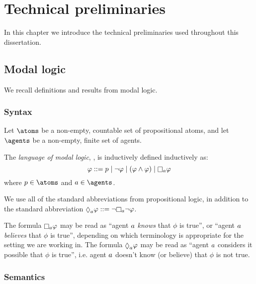 \chapter{Technical preliminaries}

In this chapter we introduce the technical preliminaries used throughout this dissertation.

\section{Modal logic}

We recall definitions and results from modal logic.

\subsection{Syntax}

Let $\atoms$ be a non-empty, countable set of propositional atoms, and
let $\agents$ be a non-empty, finite set of agents.

\begin{definition}
The {\em language of modal logic}, \langMl{}, is inductively defined inductively as:
$$
\phi ::= 
    \atomP \mid
    \lnot \phi \mid
    (\phi \land \phi) \mid
    \necessary[\agentA] \phi
$$
where $\atomP \in \atoms$ and $\agentA \in \agents$.
\end{definition}

We use all of the standard abbreviations from propositional logic, in addition to the standard abbreviation $\possible[\agentA] \phi ::= \lnot \necessary[\agentA] \lnot \phi$.

The formula $\necessary[\agentA] \phi$ may be read as ``agent $a$ {\em knows} that $\phi$ is true'', or ``agent $a$ {\em believes} that $\phi$ is true'', depending on which terminology is appropriate for the setting we are working in.
The formula $\possible[\agentA] \phi$ may be read as ``agent $a$ considers it possible that $\phi$ is true'', i.e. agent $a$ doesn't know (or believe) that $\phi$ is not true.

\subsection{Semantics}

